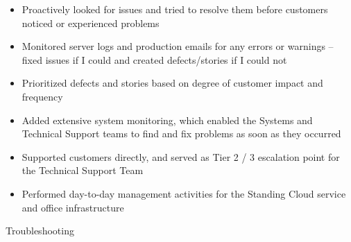 \begin{experiences}
{\begin{itemize}
                        \item Proactively looked for issues and tried to resolve them before customers noticed or experienced problems
                        \item Monitored server logs and production emails for any errors or warnings -- fixed issues if I could and created defects/stories if I could not
                        \item Prioritized defects and stories based on degree of customer impact and frequency
                        \item Added extensive system monitoring, which enabled the Systems and Technical Support teams to find and fix problems as soon as they occurred
                        \item Supported customers directly, and served as Tier 2 / 3 escalation point for the Technical Support Team
                        \item Performed day-to-day management activities for the Standing Cloud service and office infrastructure
                      \end{itemize}
                    }
                    {Troubleshooting}

\end{experiences}
